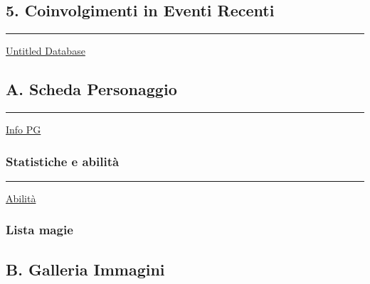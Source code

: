 \subsection{5. Coinvolgimenti in Eventi
Recenti}\label{coinvolgimenti-in-eventi-recenti}

\begin{center}\rule{0.5\linewidth}{0.5pt}\end{center}

\href{Untitled\%20Database\%20754f52a89d644d8ca010c7a6e6a0ab2d.csv}{Untitled
Database}

\subsection{A. Scheda Personaggio}\label{a.-scheda-personaggio}

\begin{center}\rule{0.5\linewidth}{0.5pt}\end{center}

\href{Info\%20PG\%20f9257877918c439f8332081b5e2452c2.csv}{Info PG}

\subsubsection{Statistiche e abilità}\label{statistiche-e-abilituxe0}

\begin{center}\rule{0.5\linewidth}{0.5pt}\end{center}

\href{Abilita\%CC\%80\%2001d18c05f5194fafac229faf5a23bbc2.csv}{Abilità}

\subsubsection{Lista magie}\label{lista-magie}

\subsection{B. Galleria Immagini}\label{b.-galleria-immagini}

